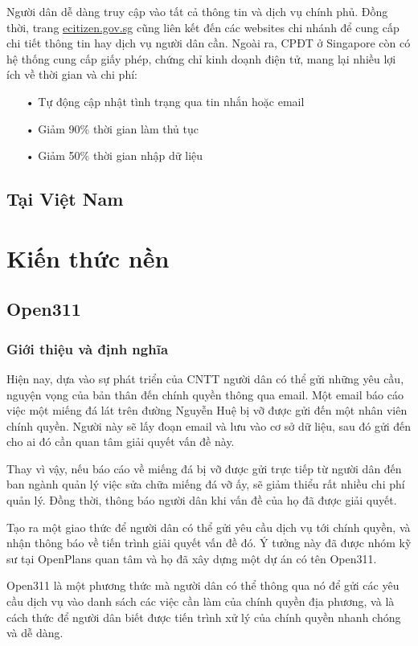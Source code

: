 \documentclass[a4paper]{article}
\begin{document}
Người dân dễ dàng truy cập vào tất cả thông tin và dịch vụ chính phủ. Đồng thời, trang \href{ecitizen.gov.sg}{ecitizen.gov.sg} cũng liên kết đến các websites chi nhánh để cung cấp chi tiết thông tin hay dịch vụ người dân cần. 
Ngoài ra, CPĐT ở Singapore còn có hệ thống cung cấp giấy phép, chứng chỉ kinh doạnh điện tử, mang lại nhiều lợi ích về thời gian và chi phí:
	\begin{itemize}
	\item[•]Tự động cập nhật tình trạng qua tin nhắn hoặc email
	\item[•]Giảm 90\% thời gian làm thủ tục
	\item[•]Giảm 50\% thời gian nhập dữ liệu  
	\end{itemize}
\subsection{Tại Việt Nam}

\section{Kiến thức nền}
\subsection{Open311}
\subsubsection{Giới thiệu và định nghĩa}
Hiện nay, dựa vào sự phát triển của CNTT người dân có thể gửi những yêu cầu, nguyện vọng của bản thân đến chính quyền thông qua email. Một email báo cáo việc một miếng đá lát trên đường Nguyễn Huệ bị vỡ được gửi đến một nhân viên chính quyền. Người này sẽ lấy đoạn email và lưu vào cơ sở dữ liệu, sau đó gửi đến cho ai đó cần quan tâm giải quyết vấn đề này.

Thay vì vậy, nếu báo cáo về miếng đá bị vỡ được gửi trực tiếp từ người dân đến ban ngành quản lý việc sửa chữa miếng đá vỡ ấy, sẽ giảm thiểu rất nhiều chi phí quản lý. Đồng thời, thông báo người dân khi vấn đề của họ đã được giải quyết.

Tạo ra một giao thức để người dân có thể gửi yêu cầu dịch vụ tới chính quyền, và nhận thông báo về tiến trình giải quyết vấn đề đó. Ý tưởng này đã được nhóm kỹ sư tại OpenPlans quan tâm và họ đã xây dựng một dự án có tên Open311.

Open311 là một phương thức mà người dân có thể thông qua nó để gửi các yêu cầu dịch vụ vào danh sách các việc cần làm của chính quyền địa phương, và là cách thức để người dân biết được tiến trình xử lý của chính quyền nhanh chóng và dễ dàng.
\end{document}
